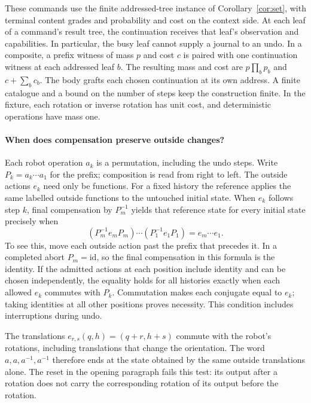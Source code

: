 \documentclass[11pt]{article}
\numberwithin{equation}{section}
\theoremstyle{definition}\newtheorem{definition}[theorem]{Definition}
\newcommand{\id}{\mathrm{id}}\newcommand{\op}{\mathrm{op}}\newcommand{\dom}{\mathrm{dom}}\newcommand{\cod}{\mathrm{cod}}
\begin{document}
These commands use the finite addressed-tree instance of
Corollary~\ref{cor:set}, with terminal content grades and probability
and cost on the context side. At each leaf of a command's result tree,
the continuation receives that leaf's observation and capabilities.
In particular, the busy leaf cannot supply a journal to an undo.
In a composite, a prefix witness of mass \(p\) and cost \(c\) is paired
with one continuation witness at each addressed leaf \(b\). The
resulting mass and cost are \(p\prod_b p_b\) and \(c+\sum_b c_b\).
The body grafts each chosen continuation at its own address. A finite
catalogue and a bound on the number of steps keep the construction
finite. In the fixture, each rotation or inverse rotation has unit
cost, and deterministic operations have mass one.

\paragraph{When does compensation preserve outside changes?}
Each robot operation \(a_k\) is a permutation, including the undo
steps. Write \(P_k=a_k\cdots a_1\) for the prefix; composition is read
from right to left. The outside actions \(e_k\) need only be functions.
For a fixed history the reference applies the same labelled outside
functions to the untouched initial state. When \(e_k\) follows step
\(k\), final compensation by \(P_m^{-1}\) yields that reference state
for every initial state precisely when
\begin{equation}\label{eq:robot-full-prefix}
 (P_m^{-1}e_mP_m)\cdots(P_1^{-1}e_1P_1)=e_m\cdots e_1 .
\end{equation}
To see this, move each outside action past the prefix that precedes
it. In a completed abort \(P_m=\id\), so the final compensation in this
formula is the identity. If the admitted actions at each position
include identity and can be chosen independently, the equality holds
for all histories exactly when each allowed \(e_k\) commutes with
\(P_k\). Commutation makes each conjugate equal to \(e_k\); taking
identities at all other positions proves necessity. This condition
includes interruptions during undo.

The translations \(e_{r,s}(q,h)=(q+r,h+s)\) commute with the robot's
rotations, including translations that change the orientation.
The word \(a,a,a^{-1},a^{-1}\) therefore ends at the state obtained by
the same outside translations alone. The reset in the opening
paragraph fails this test: its output after a rotation does not
carry the corresponding rotation of its output before the rotation.
\end{document}
